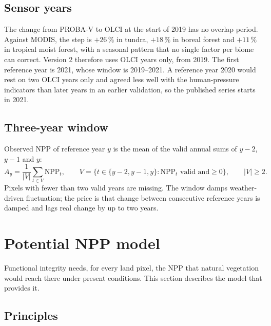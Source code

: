 \documentclass[11pt,a4paper]{article}
\begin{document}
\subsection{Sensor years}

The change from PROBA-V to OLCI at the start of 2019 has no overlap period. Against MODIS, the
step is $+26\,\%$ in tundra, $+18\,\%$ in boreal forest and $+11\,\%$ in tropical moist forest,
with a seasonal pattern that no single factor per biome can correct. Version 2 therefore uses
OLCI years only, from 2019. The first reference year is 2021, whose window is 2019--2021. A
reference year 2020 would rest on two OLCI years only and agreed less well with the human-pressure
indicators than later years in an earlier validation, so the published series starts in 2021.

\subsection{Three-year window}

Observed NPP of reference year $y$ is the mean of the valid annual sums of $y-2$, $y-1$ and $y$:
\begin{equation}
A_y = \frac{1}{|V|}\sum_{t \in V} \mathrm{NPP}_t, \qquad V = \{t \in \{y-2, y-1, y\} :
\mathrm{NPP}_t \text{ valid and} \ge 0\}, \qquad |V| \ge 2.
\end{equation}
Pixels with fewer than two valid years are missing. The window damps weather-driven fluctuation;
the price is that change between consecutive reference years is damped and lags real change by
up to two years.

\section{Potential NPP model}
\label{sec:potential}

Functional integrity needs, for every land pixel, the NPP that natural vegetation would reach
there under present conditions. This section describes the model that provides it.

\subsection{Principles}
\end{document}
